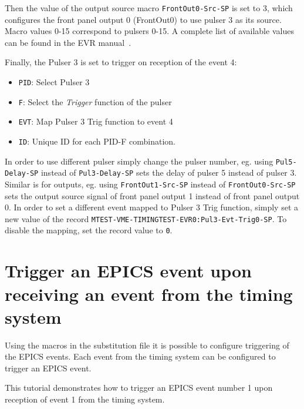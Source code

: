 \documentclass[12pt,a4paper]{article}
\begin{document}
Then the value of the output source macro \texttt{FrontOut0-Src-SP} is set to 3, which configures the front panel output 0 (FrontOut0) to use pulser 3 as its source. Macro values 0-15 correspond to pulsers 0-15. A complete list of available values can be found in the EVR manual~\cite{evr_manual}.

Finally, the Pulser 3 is set to trigger on reception of the event 4:
\begin{itemize}
	\item \texttt{PID}: Select Pulser 3
	\item \texttt{F}: Select the \textit{Trigger} function of the pulser
	\item \texttt{EVT}: Map Pulser 3 Trig function to event 4
	\item \texttt{ID}: Unique ID for each PID-F combination.
\end{itemize}

In order to use different pulser simply change the pulser number, eg. using \texttt{Pul5-Delay-SP} instead of \texttt{Pul3-Delay-SP} sets the delay of pulser 5 instead of pulser 3.
Similar is for outputs, eg. using \texttt{FrontOut1-Src-SP} instead of \texttt{FrontOut0-Src-SP} sets the output source signal of front panel output 1 instead of front panel output 0. In order to set a different event mapped to Pulser 3 Trig function, simply set a new value of the record \texttt{MTEST-VME-TIMINGTEST-EVR0:Pul3-Evt-Trig0-SP}. To disable the mapping, set the record value to \texttt{0}.

\section{Trigger an EPICS event upon receiving an event from the timing system}
Using the macros in the substitution file it is possible to configure triggering of the EPICS events. Each event from the timing system can be configured to trigger an EPICS event.

This tutorial demonstrates how to trigger an EPICS event number 1 upon reception of event 1 from the timing system.
\end{document}
